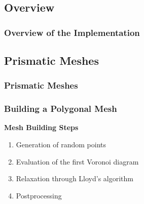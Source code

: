 \subsection{Overview}

\begin{frame}
    \frametitle{Overview of the Implementation}

    
\end{frame}

\subsection{Prismatic Meshes}

\begin{frame}
    \frametitle{Prismatic Meshes}

    
\end{frame}

\begin{frame} %
    \frametitle{Building a Polygonal Mesh}

    \vspace*{\fill}
    \begin{multicols}{2}
        
        \vspace*{\fill}
        \begin{center}
            {\color{\accentcolor} \Large \textbf{Mesh Building Steps}}
            \vspace*{0.5cm}

            \begin{minipage}{0.4\textwidth}
                \begin{enumerate}
                    \item {\color{\accentcolor} Generation of random points}
                    \item Evaluation of the first Voronoi diagram
                    \item Relaxation through Lloyd's algorithm
                    \item Postprocessing
                \end{enumerate}
            \end{minipage}
        \end{center}
        \vspace*{\fill}

        \vfill\null
        \columnbreak

        \vspace*{\fill}
        \begin{figure}[!ht]
            \centering
            
        \end{figure}
        \vspace*{\fill}

    \end{multicols}
    \vspace*{\fill}
    
\end{frame}


